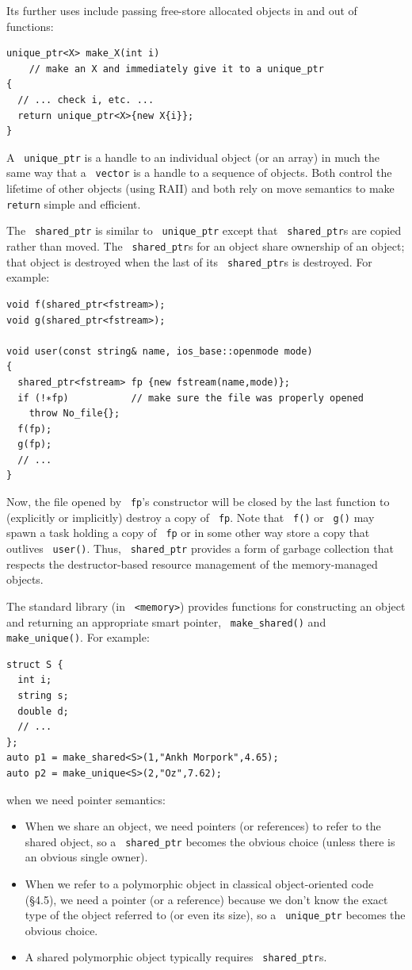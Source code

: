 \documentclass[11pt]{article}
\let\OldTexttt\texttt
\renewcommand{\texttt}[1]{\OldTexttt{\color{MidnightBlue} #1}}
\begin{document}
Its further uses include passing free-store allocated objects in and out of functions:
\begin{verbatim}
unique_ptr<X> make_X(int i)
    // make an X and immediately give it to a unique_ptr
{
  // ... check i, etc. ...
  return unique_ptr<X>{new X{i}};
}
\end{verbatim}

A \texttt{unique\_ptr} is a handle to an individual object (or an array) in much the same way that a
\texttt{vector} is a handle to a sequence of objects. Both control the lifetime of other objects (using
RAII) and both rely on move semantics to make \texttt{return} simple and efficient.

The \texttt{shared\_ptr} is similar to \texttt{unique\_ptr} except that \texttt{shared\_ptr}s are copied rather than
moved.
The \texttt{shared\_ptr}s for an object share ownership of an object; that object is destroyed when the
last of its \texttt{shared\_ptr}s is destroyed. For example:
\begin{verbatim}
void f(shared_ptr<fstream>);
void g(shared_ptr<fstream>);

void user(const string& name, ios_base::openmode mode)
{
  shared_ptr<fstream> fp {new fstream(name,mode)};
  if (!∗fp)           // make sure the file was properly opened
    throw No_file{};
  f(fp);
  g(fp);
  // ...
}
\end{verbatim}

Now, the file opened by \texttt{fp}'s constructor will be closed by the last function to (explicitly or
implicitly) destroy a copy of \texttt{fp}. Note that \texttt{f()} or \texttt{g()} may spawn a task holding a copy of \texttt{fp}
or in some other way store a copy that outlives \texttt{user()}. Thus, \texttt{shared\_ptr} provides a form of
garbage collection that respects the destructor-based resource management of the memory-managed
objects.

The standard library (in \texttt{<memory>}) provides functions for constructing an object and returning
an appropriate smart pointer, \texttt{make\_shared()} and \texttt{make\_unique()}. For example:
\begin{verbatim}
struct S {
  int i;
  string s;
  double d;
  // ...
};
auto p1 = make_shared<S>(1,"Ankh Morpork",4.65);
auto p2 = make_unique<S>(2,"Oz",7.62);

\end{verbatim}

when we need pointer semantics:
\begin{itemize}
\item When we share an object, we need pointers (or references) to refer to the shared object, so a
\texttt{shared\_ptr} becomes the obvious choice (unless there is an obvious single owner).
\item When we refer to a polymorphic object in classical object-oriented code (§4.5), we need a
pointer (or a reference) because we don’t know the exact type of the object referred to (or
even its size), so a \texttt{unique\_ptr} becomes the obvious choice.
\item A shared polymorphic object typically requires \texttt{shared\_ptr}s.
\end{itemize}
\end{document}
